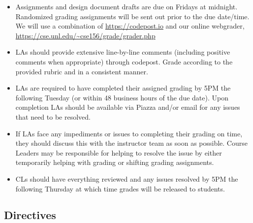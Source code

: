 \documentclass[12pt]{scrartcl}
\begin{document}
\begin{itemize}
  \item Assignments and design document drafts are due on Fridays at midnight.  
  Randomized grading assignments will be sent out prior to the due 
  date/time.  We will use a combination of \url{https://codepost.io}
  and our online webgrader, \url{https://cse.unl.edu/~cse156/grade/grader.php}
  
  \item LAs should provide extensive line-by-line comments (including
  positive comments when appropriate) through codepost.  Grade according
  to the provided rubric and in a consistent manner.  
    
  \item LAs are required to have completed their assigned grading by 
    5PM the following Tuesday (or within 48 business hours of the due 
    date).  Upon completion LAs should be available via Piazza and/or 
    email for any issues that need to be resolved.
  \item If LAs face any impediments or issues to completing
    their grading on time, they should discuss this with the instructor
    team as soon as possible.  Course Leaders may be 
    responsible for helping to resolve the issue by either 
    temporarily helping with grading or shifting grading assignments.  
  \item CLs should have everything reviewed and
    any issues resolved by 5PM the following Thursday at which time 
    grades will be released to students.

\end{itemize}

\subsection*{Directives}
\end{document}
